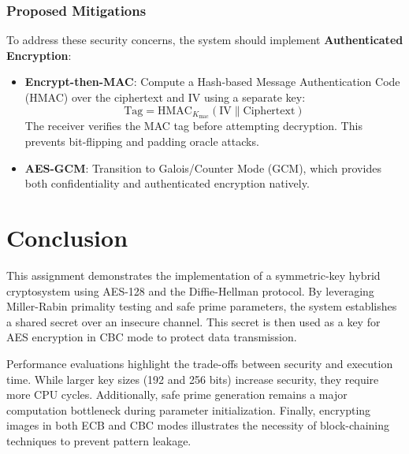 \documentclass[11pt,a4paper]{article}
\begin{document}
\subsubsection{Proposed Mitigations}
To address these security concerns, the system should implement \textbf{Authenticated Encryption}:
\begin{itemize}
    \item \textbf{Encrypt-then-MAC}: Compute a Hash-based Message Authentication Code (HMAC) over the ciphertext and IV using a separate key:
    \begin{equation}
        \text{Tag} = \text{HMAC}_{K_{\text{mac}}}(\text{IV} \parallel \text{Ciphertext})
    \end{equation}
    The receiver verifies the MAC tag before attempting decryption. This prevents bit-flipping and padding oracle attacks.
    \item \textbf{AES-GCM}: Transition to Galois/Counter Mode (GCM), which provides both confidentiality and authenticated encryption natively.
\end{itemize}

\section{Conclusion}
This assignment demonstrates the implementation of a symmetric-key hybrid cryptosystem using AES-128 and the Diffie-Hellman protocol. By leveraging Miller-Rabin primality testing and safe prime parameters, the system establishes a shared secret over an insecure channel. This secret is then used as a key for AES encryption in CBC mode to protect data transmission.

Performance evaluations highlight the trade-offs between security and execution time. While larger key sizes (192 and 256 bits) increase security, they require more CPU cycles. Additionally, safe prime generation remains a major computation bottleneck during parameter initialization. Finally, encrypting images in both ECB and CBC modes illustrates the necessity of block-chaining techniques to prevent pattern leakage.
\end{document}

